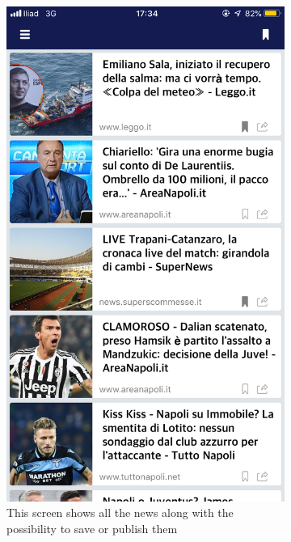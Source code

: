 \documentclass[numbers=noenddot, 12pt, a4paper, oneside]{scrbook}
\begin{document}
\begin{figure}[H]
	\begin{subfigure}{.5\textwidth}
		\centering
		\includegraphics[width=.8\linewidth]{images/Screen/News}
		\caption{This screen shows all the news along with the possibility to save or publish them}
	\end{subfigure}
	\begin{subfigure}{.5\textwidth}
		\centering

\end{subfigure}
\end{figure}
\end{document}
